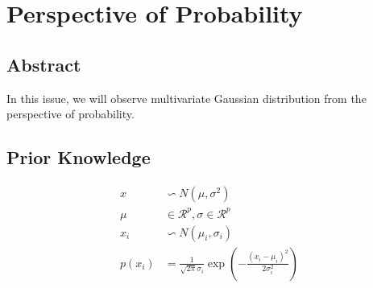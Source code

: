 \documentclass{report}
\begin{document}
\chapter{Perspective of Probability}
\section{Abstract}
In this issue, we will observe multivariate Gaussian distribution from the perspective of probability.
\section{Prior Knowledge}
$$
\begin{aligned}
x &\backsim N(\mu, \sigma^2)\\
\mu &\in \mathcal{R}^p, \sigma \in \mathcal{R}^p\\
x_i &\backsim N(\mu_i, \sigma_i)\\
p(x_i) &= \frac{1}{\sqrt{2\pi}\sigma_i} \exp(-\frac{(x_i - \mu_i)^2}{2\sigma_i^2})
\end{aligned}
$$
\end{document}
